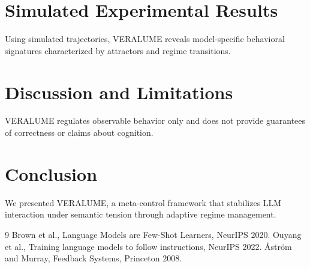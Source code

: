 \documentclass[11pt]{article}
\begin{document}
\section{Simulated Experimental Results}
Using simulated trajectories, VERALUME reveals model-specific behavioral signatures characterized by attractors and regime transitions.

\section{Discussion and Limitations}
VERALUME regulates observable behavior only and does not provide guarantees of correctness or claims about cognition.

\section{Conclusion}
We presented VERALUME, a meta-control framework that stabilizes LLM interaction under semantic tension through adaptive regime management.

\begin{thebibliography}{9}
 Brown et al., Language Models are Few-Shot Learners, NeurIPS 2020.
 Ouyang et al., Training language models to follow instructions, NeurIPS 2022.
 \AA str\"om and Murray, Feedback Systems, Princeton 2008.
\end{thebibliography}
\end{document}
